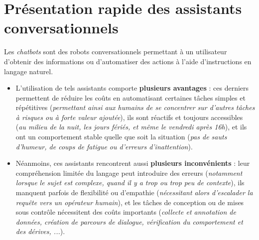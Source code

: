 	\minitoc
	
	
	\newpage
	\section{Présentation rapide des assistants conversationnels}
	\label{annex:B.1-ANNEXE-CHATBOTS-PRESENTATION}
	
		Les \textit{chatbots} sont des robots conversationnels permettant à un utilisateur d'obtenir des informations ou d'automatiser des actions à l'aide d'instructions en langage naturel.
		\begin{itemize}
			\item[\textcolor{colorDarkPastelGreen}{\textcolor{colorDarkPastelGreen}{\faThumbsUp}}] L'utilisation de tels assistants comporte \textbf{plusieurs avantages} :
			ces derniers permettent de réduire les coûts en automatisant certaines tâches simples et répétitives (\textit{permettant ainsi aux humains de se concentrer sur d'autres tâches à risques ou à forte valeur ajoutée}),
			ils sont réactifs et toujours accessibles (\textit{au milieu de la nuit, les jours fériés, et même le vendredi après 16h}),
			et ils ont un comportement stable quelle que soit la situation (\textit{pas de sauts d'humeur, de coups de fatigue ou d'erreurs d'inattention}).
			\item[\textcolor{colorDarkPastelRed}{\textcolor{colorDarkPastelRed}{\faThumbsDown}}] Néanmoins, ces assistants rencontrent aussi \textbf{plusieurs inconvénients} :
			leur compréhension limitée du langage peut introduire des erreurs (\textit{notamment lorsque le sujet est complexe, quand il y a trop ou trop peu de contexte}),
			ils manquent parfois de flexibilité ou d'empathie (\textit{nécessitant alors d'escalader la requête vers un opérateur humain}),
			et les tâches de conception ou de mises sous contrôle nécessitent des coûts importants (\textit{collecte et annotation de données, création de parcours de dialogue, vérification du comportement et des dérives, ...}).
		\end{itemize}
		
